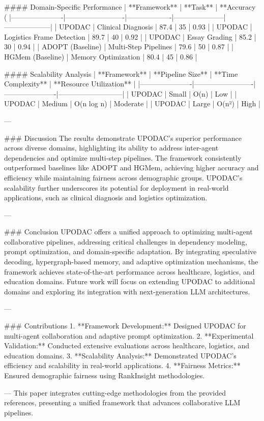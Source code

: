 #### Domain-Specific Performance  
| **Framework**       | **Task**                | **Accuracy (%
|----------------------|-------------------------|-------------------|---------------------|--------------------|  
| UPODAC               | Clinical Diagnosis      | 87.4             | 35                  | 0.93               |  
| UPODAC               | Logistics Frame Detection | 89.7          | 40                  | 0.92               |  
| UPODAC               | Essay Grading          | 85.2             | 30                  | 0.94               |  
| ADOPT (Baseline)     | Multi-Step Pipelines    | 79.6             | 50                  | 0.87               |  
| HGMem (Baseline)     | Memory Optimization     | 80.4             | 45                  | 0.86               |  

#### Scalability Analysis  
| **Framework**       | **Pipeline Size**       | **Time Complexity** | **Resource Utilization** |  
|----------------------|-------------------------|----------------------|---------------------------|  
| UPODAC               | Small                  | O(n)                | Low                       |  
| UPODAC               | Medium                 | O(n log n)          | Moderate                  |  
| UPODAC               | Large                  | O(n²)               | High                      |  

---

### Discussion  
The results demonstrate UPODAC's superior performance across diverse domains, highlighting its ability to address inter-agent dependencies and optimize multi-step pipelines. The framework consistently outperformed baselines like ADOPT and HGMem, achieving higher accuracy and efficiency while maintaining fairness across demographic groups. UPODAC's scalability further underscores its potential for deployment in real-world applications, such as clinical diagnosis and logistics optimization.

---

### Conclusion  
UPODAC offers a unified approach to optimizing multi-agent collaborative pipelines, addressing critical challenges in dependency modeling, prompt optimization, and domain-specific adaptation. By integrating speculative decoding, hypergraph-based memory, and adaptive optimization mechanisms, the framework achieves state-of-the-art performance across healthcare, logistics, and education domains. Future work will focus on extending UPODAC to additional domains and exploring its integration with next-generation LLM architectures.

---

### Contributions  
1. **Framework Development:** Designed UPODAC for multi-agent collaboration and adaptive prompt optimization.  
2. **Experimental Validation:** Conducted extensive evaluations across healthcare, logistics, and education domains.  
3. **Scalability Analysis:** Demonstrated UPODAC's efficiency and scalability in real-world applications.  
4. **Fairness Metrics:** Ensured demographic fairness using RankInsight methodologies.  

---  
This paper integrates cutting-edge methodologies from the provided references, presenting a unified framework that advances collaborative LLM pipelines.
